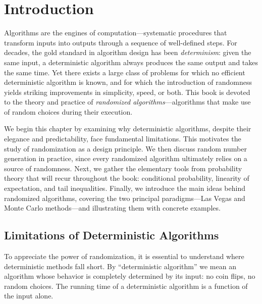 \documentclass[twoside,12pt]{book}
\theoremstyle{plain}
\theoremstyle{definition}
\theoremstyle{remark}
\begin{document}
\tableofcontents
\clearpage

\hypersetup{pageanchor=true}
\mainmatter


\chapter{Introduction}
\label{ch:introduction}

Algorithms are the engines of computation---systematic procedures that
transform inputs into outputs through a sequence of well-defined steps.
For decades, the gold standard in algorithm design has been
\emph{determinism}: given the same input, a deterministic algorithm always
produces the same output and takes the same time. Yet there exists a large
class of problems for which no efficient deterministic algorithm is known,
and for which the introduction of randomness yields striking improvements in
simplicity, speed, or both. This book is devoted to the theory and practice
of \emph{randomized algorithms}---algorithms that make use of random choices
during their execution.

We begin this chapter by examining why deterministic algorithms, despite
their elegance and predictability, face fundamental limitations. This
motivates the study of randomization as a design principle. We then
discuss random number generation in practice, since every randomized
algorithm ultimately relies on a source of randomness. Next, we gather
the elementary tools from probability theory that will recur throughout
the book: conditional probability, linearity of expectation, and tail
inequalities. Finally, we introduce the main ideas behind randomized
algorithms, covering the two principal paradigms---Las Vegas and Monte
Carlo methods---and illustrating them with concrete examples.

\section{Limitations of Deterministic Algorithms}
\label{sec:det-limits}

To appreciate the power of randomization, it is essential to understand
where deterministic methods fall short. By ``deterministic algorithm'' we
mean an algorithm whose behavior is completely determined by its input: no
coin flips, no random choices. The running time of a deterministic algorithm
is a function of the input alone.
\end{document}
